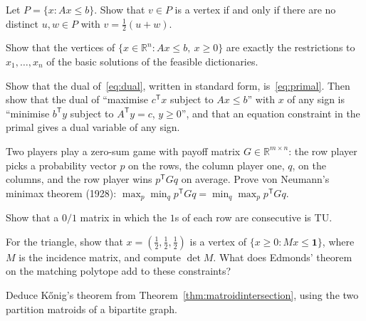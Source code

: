 \begin{exercise}[$\star$]\label{ex:extreme}
Let $P=\{x:Ax\le b\}$. Show that $v\in P$ is a vertex if and only if there are no distinct $u,w\in P$ with $v=\tfrac12(u+w)$.
\end{exercise}

\begin{exercise}[$\star\star$]\label{ex:bfsvertex}
Show that the vertices of $\{x\in\mathbb R^n:Ax\le b,\ x\ge0\}$ are exactly the restrictions to $x_1,\dots,x_n$ of the basic solutions of the feasible dictionaries.
\end{exercise}

\begin{exercise}[$\star$]\label{ex:dualrules}
Show that the dual of~\eqref{eq:dual}, written in standard form, is~\eqref{eq:primal}. Then show that the dual of ``maximise $c^{\mathsf T}x$ subject to $Ax\le b$'' with $x$ of any sign is ``minimise $b^{\mathsf T}y$ subject to $A^{\mathsf T}y=c$, $y\ge0$'', and that
an equation constraint in the primal gives a dual variable of any sign.
\end{exercise}

\begin{exercise}[$\star\star$]\label{ex:gamevalue}
Two players play a zero-sum game with payoff matrix $G\in\mathbb R^{m\times n}$: the row player picks a probability vector $p$ on the rows, the column player one, $q$, on the columns, and the row player wins $p^{\mathsf T}Gq$ on average. Prove von Neumann's minimax
theorem (1928): $\max_p\min_q p^{\mathsf T}Gq=\min_q\max_p p^{\mathsf T}Gq$.
\end{exercise}

\begin{exercise}[$\star$]\label{ex:tuinterval}
Show that a $0/1$ matrix in which the $1$s of each row are consecutive is TU.
\end{exercise}

\begin{exercise}[$\star$]\label{ex:oddcycle}
For the triangle, show that $x=(\tfrac12,\tfrac12,\tfrac12)$ is a vertex of $\{x\ge0:Mx\le\mathbf1\}$, where $M$ is the incidence matrix, and compute $\det M$. What does Edmonds' theorem on the matching polytope add to these constraints?
\end{exercise}

\begin{exercise}[$\star\star$]\label{ex:koniglp}
Deduce K\H onig's theorem from Theorem~\ref{thm:matroidintersection}, using the two partition matroids of a bipartite graph.
\end{exercise}

